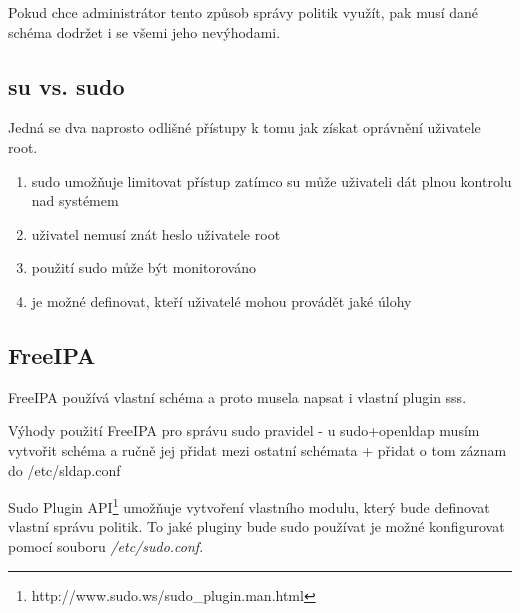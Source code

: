\documentclass[10pt,a4paper,notitlepage]{article}
\begin{document}
Pokud chce administrátor tento způsob správy politik využít, pak musí dané
schéma dodržet i se všemi jeho nevýhodami.

\subsection{su vs. sudo}
Jedná se dva naprosto odlišné přístupy k tomu jak získat oprávnění uživatele
root.

\begin{enumerate}
	\item sudo umožňuje limitovat přístup zatímco su může uživateli dát plnou
		kontrolu nad systémem
	\item uživatel nemusí znát heslo uživatele root
	\item použití sudo může být monitorováno
	\item je možné definovat, kteří uživatelé mohou provádět jaké úlohy
\end{enumerate}



\subsection{FreeIPA}
FreeIPA používá vlastní schéma a proto musela napsat i vlastní plugin sss.


Výhody použití FreeIPA pro správu sudo pravidel - u sudo+openldap musím vytvořit
schéma a ručně jej přidat mezi ostatní schémata + přidat o tom záznam do
/etc/sldap.conf


Sudo Plugin API\footnote{http://www.sudo.ws/sudo\_plugin.man.html}
umožňuje vytvoření vlastního modulu, který bude definovat vlastní správu
politik.  To jaké pluginy bude sudo používat je možné konfigurovat pomocí
souboru \textit{/etc/sudo.conf}.
\end{document}

